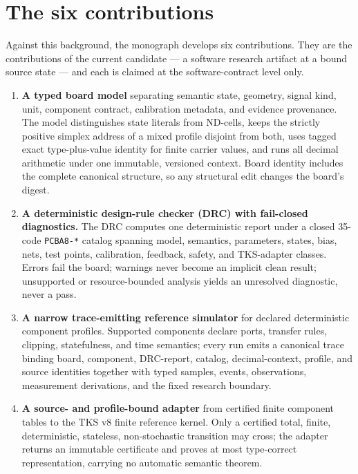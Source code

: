 \section{The six contributions}\label{ch01:contributions}

Against this background, the monograph develops six contributions. They are
the contributions of the current candidate --- a software research artifact
at a bound source state --- and each is claimed at the software-contract
level only.

\begin{enumerate}
\item \textbf{A typed board model} separating semantic state, geometry,
signal kind, unit, component contract, calibration metadata, and evidence
provenance. The model distinguishes state literals from ND-cells, keeps the
strictly positive simplex address of a mixed profile disjoint from both, uses
tagged exact type-plus-value identity for finite carrier values, and runs
all decimal arithmetic under one immutable, versioned context. Board
identity includes the complete canonical structure, so any structural edit
changes the board's digest.

\item \textbf{A deterministic design-rule checker (DRC) with fail-closed
diagnostics.} The DRC computes one deterministic report under a closed
35-code \texttt{PCBA8-*} catalog spanning model, semantics, parameters,
states, bias, nets, test points, calibration, feedback, safety, and
TKS-adapter classes. Errors fail the board; warnings never become an
implicit clean result; unsupported or resource-bounded analysis yields an
unresolved diagnostic, never a pass.

\item \textbf{A narrow trace-emitting reference simulator} for declared
deterministic component profiles. Supported components declare ports,
transfer rules, clipping, statefulness, and time semantics; every run emits
a canonical trace binding board, component, DRC-report, catalog,
decimal-context, profile, and source identities together with typed samples,
events, observations, measurement derivations, and the fixed research
boundary.

\item \textbf{A source- and profile-bound adapter} from certified finite
component tables to the TKS v8 finite reference kernel. Only a certified
total, finite, deterministic, stateless, non-stochastic transition may cross;
the adapter returns an immutable certificate and proves at most type-correct
representation, carrying no automatic semantic theorem.


\end{enumerate}
